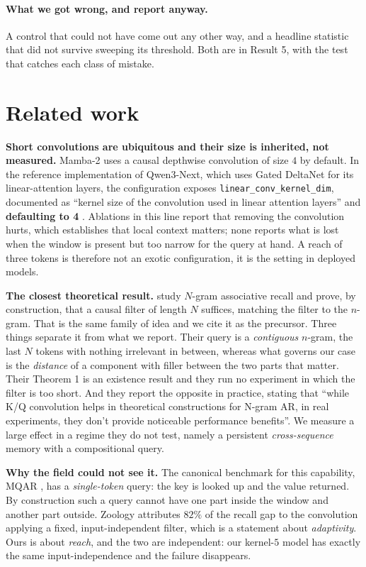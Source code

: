 \documentclass[10pt]{article}
\begin{document}
\paragraph{What we got wrong, and report anyway.} A control that could not have come out any other
way, and a headline statistic that did not survive sweeping its threshold. Both are in Result 5, with
the test that catches each class of mistake.

\section{Related work}

\textbf{Short convolutions are ubiquitous and their size is inherited, not measured.} Mamba-2
\citep{mamba2} uses a causal depthwise convolution of size $4$ by default. In the reference
implementation of Qwen3-Next, which uses Gated DeltaNet \citep{gateddeltanet} for its linear-attention
layers, the configuration exposes \texttt{linear\_conv\_kernel\_dim}, documented as ``kernel size of the
convolution used in linear attention layers'' and \textbf{defaulting to 4} \citep{qwen3next}. Ablations
in this line report that removing the convolution hurts, which establishes that local context matters;
none reports what is lost when the window is present but too narrow for the query at hand. A reach of
three tokens is therefore not an exotic configuration, it is the setting in deployed models.

\textbf{The closest theoretical result.} \citet{cat} study $N$-gram associative recall and prove, by
construction, that a causal filter of length $N$ suffices, matching the filter to the $n$-gram. That is
the same family of idea and we cite it as the precursor. Three things separate it from what we report.
Their query is a \emph{contiguous} $n$-gram, the last $N$ tokens with nothing irrelevant in between,
whereas what governs our case is the \emph{distance} of a component with filler between the two parts
that matter. Their Theorem 1 is an existence result and they run no experiment in which the filter is
too short. And they report the opposite in practice, stating that ``while K/Q convolution helps in
theoretical constructions for N-gram AR, in real experiments, they don't provide noticeable performance
benefits''. We measure a large effect in a regime they do not test, namely a persistent
\emph{cross-sequence} memory with a compositional query.

\textbf{Why the field could not see it.} The canonical benchmark for this capability, MQAR
\citep{zoology}, has a \emph{single-token} query: the key is looked up and the value returned. By
construction such a query cannot have one part inside the window and another part outside. Zoology
attributes $82\%$ of the recall gap to the convolution applying a fixed, input-independent filter, which
is a statement about \emph{adaptivity}. Ours is about \emph{reach}, and the two are independent: our
kernel-$5$ model has exactly the same input-independence and the failure disappears.
\end{document}
